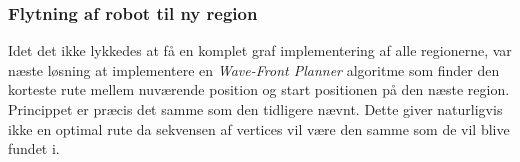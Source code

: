 \subsubsection{Flytning af robot til ny region}






Idet det ikke lykkedes at få en komplet graf implementering af alle regionerne, var næste løsning at implementere en \emph{Wave-Front Planner} algoritme som finder den korteste rute mellem nuværende position og start positionen på den næste region. Princippet er præcis det samme som den tidligere nævnt.
Dette giver naturligvis ikke en optimal rute da sekvensen af vertices vil være den samme som de vil blive fundet i.

